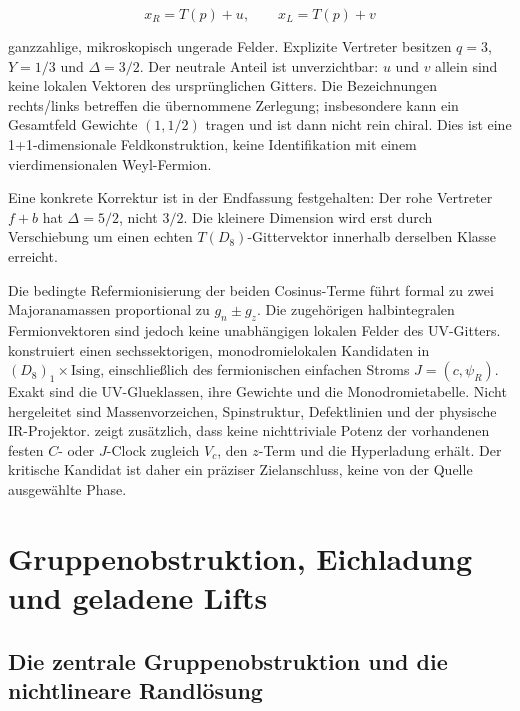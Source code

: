 \[
x_R=T(p)+u,\qquad x_L=T(p)+v
\]

ganzzahlige, mikroskopisch ungerade Felder. Explizite Vertreter besitzen \(q=3\), \(Y=1/3\) und \(\Delta=3/2\). Der neutrale Anteil ist unverzichtbar: \(u\) und \(v\) allein sind keine lokalen Vektoren des ursprünglichen Gitters. Die Bezeichnungen rechts/links betreffen die übernommene Zerlegung; insbesondere kann ein Gesamtfeld Gewichte \((1,1/2)\) tragen und ist dann nicht rein chiral. Dies ist eine 1+1-dimensionale Feldkonstruktion, keine Identifikation mit einem vierdimensionalen Weyl-Fermion.

Eine konkrete Korrektur ist in der Endfassung festgehalten: Der rohe Vertreter \(f+b\) hat \(\Delta=5/2\), nicht \(3/2\). Die kleinere Dimension wird erst durch Verschiebung um einen echten \(T(D_8)\)-Gittervektor innerhalb derselben Klasse erreicht.

Die bedingte Refermionisierung der beiden Cosinus-Terme führt formal zu zwei Majoranamassen proportional zu \(g_n\pm g_z\). Die zugehörigen halbintegralen Fermionvektoren sind jedoch keine unabhängigen lokalen Felder des UV-Gitters.  konstruiert einen sechssektorigen, monodromielokalen Kandidaten in \((D_8)_1\times\mathrm{Ising}\), einschließlich des fermionischen einfachen Stroms \(J=(c,\psi_R)\). Exakt sind die UV-Glueklassen, ihre Gewichte und die Monodromietabelle. Nicht hergeleitet sind Massenvorzeichen, Spinstruktur, Defektlinien und der physische IR-Projektor.  zeigt zusätzlich, dass keine nichttriviale Potenz der vorhandenen festen \(C\)- oder \(J\)-Clock zugleich \(V_c\), den \(z\)-Term und die Hyperladung erhält. Der kritische Kandidat ist daher ein präziser Zielanschluss, keine von der Quelle ausgewählte Phase.


\chapter{Gruppenobstruktion, Eichladung und geladene Lifts}
\section{Die zentrale Gruppenobstruktion und die nichtlineare Randlösung}

